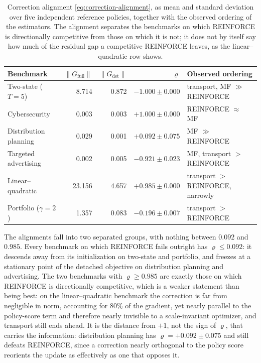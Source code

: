 \begin{table}[H]
\centering
\begin{tabular}{lrrrl}
\toprule
Benchmark & $\|G_{\mathrm{full}}\|$ & $\|G_{\mathrm{det}}\|$ & $\varrho$ & Observed ordering \\
\midrule
Two-state ($T=5$)          &  8.714 & 0.872 & $-1.000\pm0.000$ & transport, MF $\gg$ REINFORCE \\
Cybersecurity              &  0.003 & 0.003 & $+1.000\pm0.000$ & REINFORCE $\approx$ MF \\
Distribution planning      &  0.029 & 0.001 & $+0.092\pm0.075$ & MF $\gg$ REINFORCE \\
Targeted advertising       &  0.002 & 0.005 & $-0.921\pm0.023$ & MF, transport $>$ REINFORCE \\
Linear--quadratic          & 23.156 & 4.657 & $+0.985\pm0.000$ & transport $>$ REINFORCE, narrowly \\
Portfolio ($\gamma=2$)     &  1.357 & 0.083 & $-0.196\pm0.007$ & transport $>$ REINFORCE \\
\bottomrule
\end{tabular}
\caption{Correction alignment \eqref{eq:correction-alignment}, as mean and standard deviation over five independent reference policies, together with the observed ordering of the estimators. The alignment separates the benchmarks on which REINFORCE is directionally competitive from those on which it is not; it does not by itself say how much of the residual gap a competitive REINFORCE leaves, as the linear--quadratic row shows.}
\label{tab:correction-alignment}
\end{table}

The alignments fall into two separated groups, with nothing between $0.092$ and $0.985$. Every benchmark on which REINFORCE fails outright has $\varrho\leq0.092$: it descends away from its initialization on two-state and portfolio, and freezes at a stationary point of the detached objective on distribution planning and advertising. The two benchmarks with $\varrho\geq0.985$ are exactly those on which REINFORCE is directionally competitive, which is a weaker statement than being best: on the linear--quadratic benchmark the correction is far from negligible in norm, accounting for $80\%$ of the gradient, yet nearly parallel to the policy-score term and therefore nearly invisible to a scale-invariant optimizer, and transport still ends ahead. It is the distance from $+1$, not the sign of $\varrho$, that carries the information: distribution planning has $\varrho=+0.092\pm0.075$ and still defeats REINFORCE, since a correction nearly orthogonal to the policy score reorients the update as effectively as one that opposes it.

